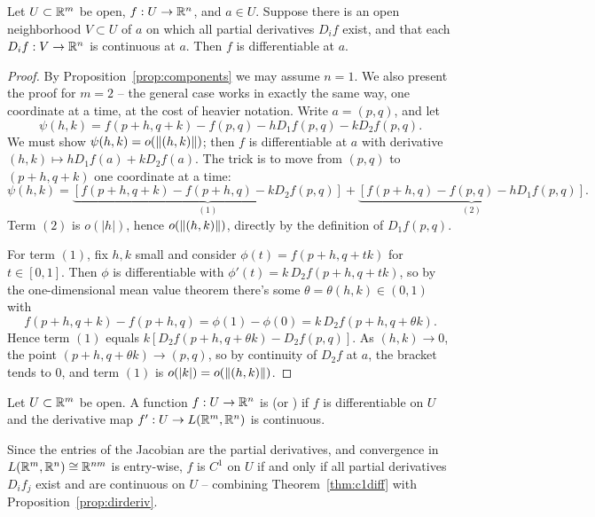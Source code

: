 \documentclass[a4paper]{scrartcl}
\begin{document}
\begin{theorem}\label{thm:c1diff}
    Let $U \subset \mathbb{R}^m$ be open, $f: U \rightarrow \mathbb{R}^n$, and $a \in U$. Suppose there is an open neighborhood $V \subset U$ of $a$ on which all partial derivatives $D_i f$ exist, and that each $D_i f: V \rightarrow \mathbb{R}^n$ is continuous at $a$. Then $f$ is differentiable at $a$.
\end{theorem}
\begin{proof}
    By Proposition~\ref{prop:components} we may assume $n = 1$. We also present the proof for $m = 2$ -- the general case works in exactly the same way, one coordinate at a time, at the cost of heavier notation. Write $a = (p, q)$, and let
    $$
    \psi(h, k) = f(p + h, q + k) - f(p, q) - hD_1f(p, q) - kD_2f(p, q).
    $$
    We must show $\psi(h, k) = o(\norm{(h,k)})$; then $f$ is differentiable at $a$ with derivative $(h, k) \mapsto hD_1f(a) + kD_2f(a)$. The trick is to move from $(p, q)$ to $(p + h, q + k)$ one coordinate at a time:
    $$
    \psi(h, k) = \underbrace{\left[f(p + h, q + k) - f(p + h, q) - kD_2f(p, q)\right]}_{(1)} + \underbrace{\left[f(p + h, q) - f(p, q) - hD_1f(p, q)\right]}_{(2)}.
    $$
    Term $(2)$ is $o(|h|)$, hence $o(\norm{(h, k)})$, directly by the definition of $D_1 f(p, q)$.

    For term $(1)$, fix $h, k$ small and consider $\phi(t) = f(p + h, q + tk)$ for $t \in [0, 1]$. Then $\phi$ is differentiable with $\phi'(t) = k \, D_2 f(p + h, q + tk)$, so by the one-dimensional mean value theorem there's some $\theta = \theta(h, k) \in (0, 1)$ with
    $$
    f(p + h, q + k) - f(p + h, q) = \phi(1) - \phi(0) = k\,D_2f(p + h, q + \theta k).
    $$
    Hence term $(1)$ equals $k\left[D_2f(p + h, q + \theta k) - D_2f(p, q)\right]$. As $(h, k) \rightarrow 0$, the point $(p + h, q + \theta k) \rightarrow (p, q)$, so by continuity of $D_2 f$ at $a$, the bracket tends to $0$, and term $(1)$ is $o(|k|) = o(\norm{(h,k)})$.
\end{proof}

\begin{definition}[$C^1$ Function]
    Let $U \subset \mathbb{R}^m$ be open. A function $f: U \rightarrow \mathbb{R}^n$ is  (or ) if $f$ is differentiable on $U$ and the derivative map $f': U \rightarrow L(\mathbb{R}^m, \mathbb{R}^n)$ is continuous.
\end{definition}

Since the entries of the Jacobian are the partial derivatives, and convergence in $L(\mathbb{R}^m, \mathbb{R}^n) \cong \mathbb{R}^{nm}$ is entry-wise, $f$ is $C^1$ on $U$ if and only if all partial derivatives $D_if_j$ exist and are continuous on $U$ -- combining Theorem~\ref{thm:c1diff} with Proposition~\ref{prop:dirderiv}.
\end{document}
